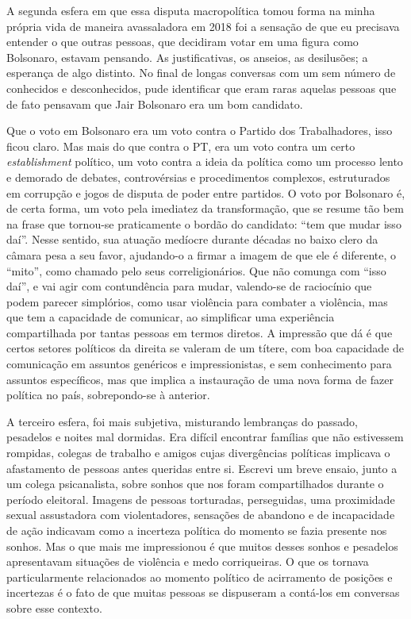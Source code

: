 A segunda esfera em que essa disputa macropolítica tomou forma na minha
própria vida de maneira avassaladora em 2018 foi a sensação de que eu
precisava entender o que outras pessoas, que decidiram votar em uma
figura como Bolsonaro, estavam pensando. As justificativas, os anseios,
as desilusões; a esperança de algo distinto. No final de longas
conversas com um sem número de conhecidos e desconhecidos, pude
identificar que eram raras aquelas pessoas que de fato pensavam que Jair
Bolsonaro era um bom candidato.

Que o voto em Bolsonaro era um voto contra o Partido dos Trabalhadores,
isso ficou claro. Mas mais do que contra o PT, era um voto contra um
certo \emph{establishment} político, um voto contra a ideia da política
como um processo lento e demorado de debates, controvérsias e
procedimentos complexos, estruturados em corrupção e jogos de disputa de
poder entre partidos. O voto por Bolsonaro é, de certa forma, um voto
pela imediatez da transformação, que se resume tão bem na frase que
tornou-se praticamente o bordão do candidato: ``tem que mudar isso
daí''. Nesse sentido, sua atuação medíocre durante décadas no baixo
clero da câmara pesa a seu favor, ajudando-o a firmar a imagem de que
ele é diferente, o ``mito'', como chamado pelo seus correligionários.
Que não comunga com ``isso daí'', e vai agir com contundência para
mudar, valendo-se de raciocínio que podem parecer simplórios, como usar
violência para combater a violência, mas que tem a capacidade de
comunicar, ao simplificar uma experiência compartilhada por tantas
pessoas em termos diretos. A impressão que dá é que certos setores
políticos da direita se valeram de um títere, com boa capacidade de
comunicação em assuntos genéricos e impressionistas, e sem conhecimento
para assuntos específicos, mas que implica a instauração de uma nova
forma de fazer política no país, sobrepondo-se à anterior.

A terceiro esfera, foi mais subjetiva, misturando lembranças do passado,
pesadelos e noites mal dormidas. Era difícil encontrar famílias que não
estivessem rompidas, colegas de trabalho e amigos cujas divergências
políticas implicava o afastamento de pessoas antes queridas entre si.
Escrevi um breve ensaio, junto a um colega psicanalista, sobre sonhos
que nos foram compartilhados durante o período eleitoral. Imagens de
pessoas torturadas, perseguidas, uma proximidade sexual assustadora com
violentadores, sensações de abandono e de incapacidade de ação indicavam
como a incerteza política do momento se fazia presente nos sonhos. Mas o
que mais me impressionou é que muitos desses sonhos e pesadelos
apresentavam situações de violência e medo corriqueiras. O que os
tornava particularmente relacionados ao momento político de acirramento
de posições e incertezas é o fato de que muitas pessoas se dispuseram a
contá-los em conversas sobre esse contexto.

